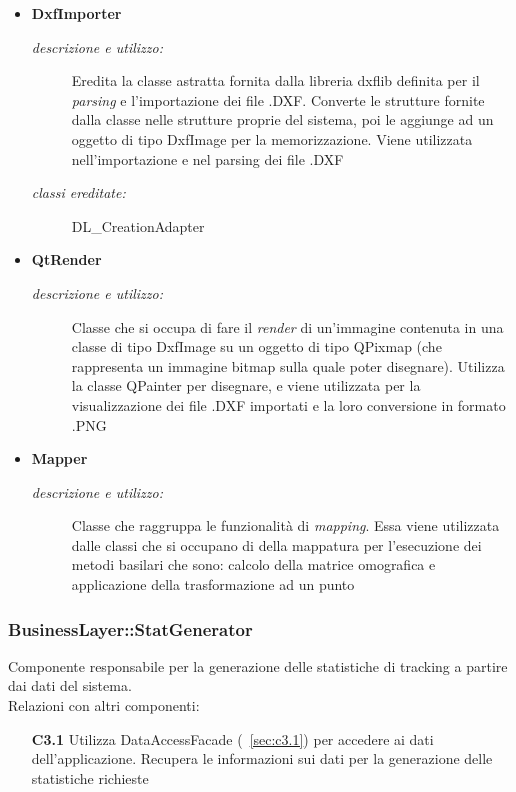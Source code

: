 \begin{itemize}
\begin{description}
\end{description}
\item \textbf{DxfImporter}
\begin{description}
\item [\textit{descrizione e utilizzo:}] Eredita la classe astratta fornita dalla libreria dxflib definita per il \textit{parsing} e l'importazione dei file .DXF. Converte le strutture fornite dalla classe nelle strutture proprie del sistema, poi le aggiunge ad un oggetto di tipo DxfImage per la memorizzazione. Viene utilizzata nell'importazione e nel parsing dei file .DXF
\item [\textit{classi ereditate:}] DL_CreationAdapter
\end{description}
\item \textbf{QtRender}
\begin{description}
\item [\textit{descrizione e utilizzo:}] Classe che si occupa di fare il \textit{render} di un'immagine contenuta in una classe di tipo DxfImage su un oggetto di tipo QPixmap (che rappresenta un immagine bitmap sulla quale poter disegnare). Utilizza la classe QPainter per disegnare, e viene utilizzata per la visualizzazione dei file .DXF importati e la loro conversione in formato .PNG
\end{description}
\item \textbf{Mapper}
\begin{description}
\item [\textit{descrizione e utilizzo:}] Classe che raggruppa le funzionalità di \textit{mapping}. Essa viene utilizzata dalle classi che si occupano di della mappatura per l'esecuzione dei metodi basilari che  sono: calcolo della matrice omografica e applicazione della trasformazione ad un punto
\end{description}
\end{itemize}

\subsubsection{BusinessLayer::StatGenerator} \label{sec:c2.3}
Componente responsabile per la generazione delle statistiche di tracking a partire dai dati del sistema. \\
Relazioni con altri componenti: 
\begin{itemize} 
\item [\textbf{C3.1}]
Utilizza DataAccessFacade (~\ref{sec:c3.1}) per accedere ai dati dell'applicazione. Recupera le informazioni sui dati per la generazione delle statistiche richieste 
\end{itemize} 

